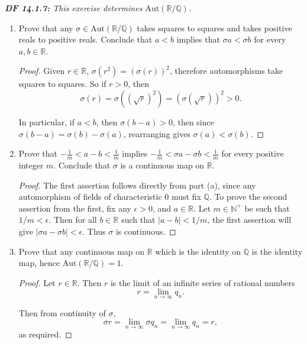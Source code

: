 \documentclass{article}
\begin{document}
\it \textbf{DF 14.1.7:} This exercise determines
  $\text{Aut}(\mathbb{R}/\mathbb{Q})$.

  \begin{enumerate}[label={(\alph*)}]
    \item Prove that any $\sigma\in\text{Aut}(\mathbb{R}/\mathbb{Q})$ takes
      squares to squares and takes positive reals to positive reals.
      Conclude that $a<b$ implies that $\sigma a<\sigma b$ for every
      $a,b\in\mathbb{R}$.

      \begin{proof}
        Given $r\in\mathbb{R}$, $\sigma(r^2)=(\sigma(r))^2$, therefore
        automorphisms take squares to squares. So if $r>0$, then
        \[\sigma(r)=\sigma((\sqrt{r})^2)=(\sigma(\sqrt{r}))^2>0.\]

        In particular, if $a<b$, then $\sigma(b-a)>0$, then since
        $\sigma(b-a)=\sigma(b)-\sigma(a)$, rearranging gives
        $\sigma(a)<\sigma(b)$.
      \end{proof}

    \item Prove that $-\frac{1}{m}<a-b<\frac{1}{m}$ implies
      $-\frac{1}{m}<\sigma a-\sigma b<\frac{1}{m}$ for every
      positive integer $m$. Conclude that $\sigma$ is a continuous map on
      $\mathbb{R}$.

      \begin{proof}
        The first assertion follows directly from part (a), since any
        automorphism of fields of characteristic 0 must fix $\mathbb{Q}$.
        To prove the second assertion from the first, fix any $\epsilon>0$,
        and $a\in\mathbb{R}$. Let $m\in\mathbb{N}^+$ be such that
        $1/m<\epsilon$. Then for all $b\in\mathbb{R}$ such that
        $|a-b|<1/m$, the first assertion will give $|\sigma a-\sigma
        b|<\epsilon$. Thus $\sigma$ is continuous.
      \end{proof}

    \item Prove that any continuous map on $\mathbb{R}$ which is the
      identity on $\mathbb{Q}$ is the identity map, hence
      $\text{Aut}(\mathbb{R}/\mathbb{Q})=1$.

      \begin{proof}
        Let $r\in\mathbb{R}$. Then $r$ is the limit of an infinite series
        of rational numbers
        \[r =\lim_{n\rightarrow\infty} q_n.\]
        
        Then from continuity of $\sigma$,
        \[\sigma r =\lim_{n\rightarrow\infty} \sigma q_n
        =\lim_{n\rightarrow\infty} q_n =r,\]
        as required.
      \end{proof}
  \end{enumerate}
\end{document}
